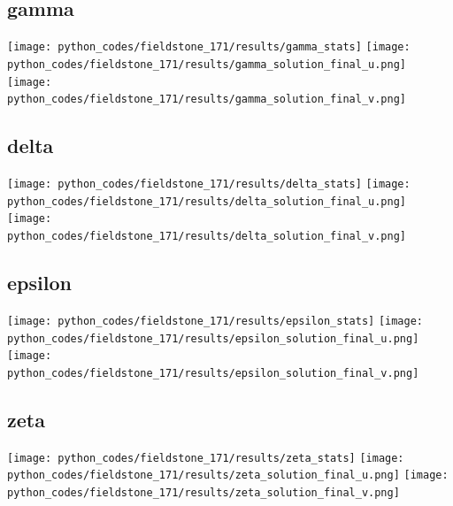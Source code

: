 \subsection*{gamma}

\begin{center}
\texttt{[image: python\_codes/fieldstone\_171/results/gamma\_stats]}
\texttt{[image: python\_codes/fieldstone\_171/results/gamma\_solution\_final\_u.png]}
\texttt{[image: python\_codes/fieldstone\_171/results/gamma\_solution\_final\_v.png]}
\end{center}

\subsection*{delta}
\begin{center}
\texttt{[image: python\_codes/fieldstone\_171/results/delta\_stats]}
\texttt{[image: python\_codes/fieldstone\_171/results/delta\_solution\_final\_u.png]}
\texttt{[image: python\_codes/fieldstone\_171/results/delta\_solution\_final\_v.png]}
\end{center}

\subsection*{epsilon}
\begin{center}
\texttt{[image: python\_codes/fieldstone\_171/results/epsilon\_stats]}
\texttt{[image: python\_codes/fieldstone\_171/results/epsilon\_solution\_final\_u.png]}
\texttt{[image: python\_codes/fieldstone\_171/results/epsilon\_solution\_final\_v.png]}
\end{center}

\subsection*{zeta}
\begin{center}
\texttt{[image: python\_codes/fieldstone\_171/results/zeta\_stats]}
\texttt{[image: python\_codes/fieldstone\_171/results/zeta\_solution\_final\_u.png]}
\texttt{[image: python\_codes/fieldstone\_171/results/zeta\_solution\_final\_v.png]}
\end{center}

